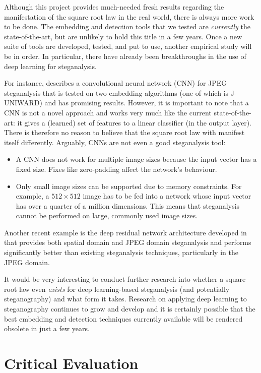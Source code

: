 \documentclass[11pt,a4paper,twoside,openright]{report}
\begin{document}
Although this project provides much-needed fresh results regarding the manifestation of the square root law in the real world, there is always more work to be done. The embedding and detection tools that we tested are \textit{currently} the state-of-the-art, but are unlikely to hold this title in a few years. Once a new suite of tools are developed, tested, and put to use, another empirical study will be in order. In particular, there have already been breakthroughs in the use of deep learning for steganalysis.

For instance, \cite{steganalysis-cnn} describes a convolutional neural network (CNN) for JPEG steganalysis that is tested on two embedding algorithms (one of which is J-UNIWARD) and has promising results. However, it is important to note that a CNN is not a novel approach and works very much like the current state-of-the-art: it gives a (learned) set of features to a linear classifier (in the output layer). There is therefore no reason to believe that the square root law with manifest itself differently. Arguably, CNNs are not even a good steganalysis tool:
\begin{itemize}
	\item A CNN does not work for multiple image sizes because the input vector has a fixed size. Fixes like zero-padding affect the network's behaviour.
	\item Only small image sizes can be supported due to memory constraints. For example, a $512 \times 512$ image has to be fed into a network whose input vector has over a quarter of a million dimensions. This means that steganalysis cannot be performed on large, commonly used image sizes.
\end{itemize}

Another recent example is the deep residual network architecture developed in \cite{deep-residual-network} that provides both spatial domain and JPEG domain steganalysis and performs significantly better than existing steganalysis techniques, particularly in the JPEG domain.

It would be very interesting to conduct further research into whether a square root law even \textit{exists} for deep learning-based steganalysis (and potentially steganography) and what form it takes. Research on applying deep learning to steganography continues to grow and develop and it is certainly possible that the best embedding and detection techniques currently available will be rendered obsolete in just a few years.


\section{Critical Evaluation}
\end{document}
